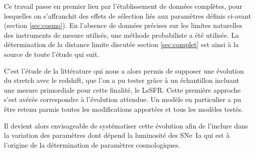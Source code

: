 \documentclass[a4paper, 12pt, svgnames]{article}
\begin{document}
Ce travail passe en premier lieu par l'établissement de données complètes, pour
lesquelles on s'affranchit des effets de sélection liés aux paramètres définis
ci-avant (section \ref{sec:cosmo}). En l'absence de données précises sur les
limites naturelles des instruments de mesure utilisés, une méthode probabiliste
a été utilisée. La détermination de la distance limite discutée section
\ref{sec:complet} est ainsi à la source de toute l'étude qui suit. \bigbreak

C'est l'étude de la littérature qui nous a alors permis de supposer une
évolution du stretch avec le redshift, que l'on a pu tester grâce à un
échantillon incluant une mesure primordiale pour cette finalité, le LsSFR. Cette
première approche s'est avérée correspondre à l'évolution attendue. Un modèle en
particulier a pu être retenu parmis toutes les modifications apportées et tous
les modèles testés. \bigbreak

Il devient alors envisageable de systématiser cette évolution afin de l'inclure
dans la variation des paramètres dont dépend la luminosité des SNe~Ia qui est à
l'origine de la détermination de paramètres cosmologiques.

%


\end{document}
